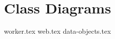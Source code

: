 \documentclass{article}
\begin{document}
\section{Class Diagrams}

{worker.tex}
{web.tex}
{data-objects.tex}
\end{document}
